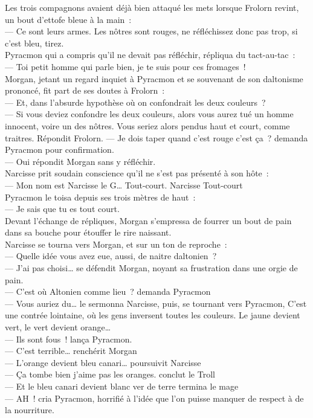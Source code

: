\documentclass[french, a4paper, 12pt]{article}
\begin{document}
Les trois compagnons avaient déjà bien attaqué les mets lorsque Frolorn revint, un bout d'ettofe bleue à la main~:\\
--- Ce sont leurs armes. Les nôtres sont rouges, ne réfléchissez donc pas trop, si c'est bleu, tirez.\\
Pyracmon qui a compris qu'il ne devait pas réfléchir, répliqua du tact-au-tac~:\\
--- Toi petit homme qui parle bien, je te suis pour ces fromages~! \\
Morgan, jetant un regard inquiet à Pyracmon et se souvenant de son daltonisme prononcé, fit part de ses doutes à Frolorn~:\\
--- Et, dans l'absurde hypothèse où on confondrait les deux couleurs~?\\
--- Si vous deviez confondre les deux couleurs, alors vous aurez tué un homme innocent, voire un des nôtres. Vous seriez alors pendus haut et court, comme traitres. Répondit Frolorn.
--- Je dois taper quand c'est rouge c'est ça~? demanda Pyracmon pour confirmation. \\
--- Oui répondit Morgan sans y réfléchir. \\

Narcisse prit soudain conscience qu'il ne s'est pas présenté à son hôte~:\\
--- Mon nom est Narcisse le G… Tout-court. Narcisse Tout-court\\
Pyracmon le toisa depuis ses trois mètres de haut~:\\
--- Je sais que tu es tout court.\\
Devant l'échange de répliques, Morgan s'empressa de fourrer un bout de pain dans sa bouche pour étouffer le rire naissant.\\

Narcisse se tourna vers Morgan, et sur un ton de reproche~:\\
--- Quelle idée vous avez eue, aussi, de naitre daltonien~?\\
--- J'ai pas choisi… se défendit Morgan, noyant sa frustration dans une orgie de pain.\\
--- C'est où Altonien comme lieu~? demanda Pyracmon\\
--- Vous auriez du… le sermonna Narcisse, puis, se tournant vers Pyracmon, C'est une contrée lointaine, où les gens inversent toutes les couleurs. Le jaune devient vert, le vert devient orange…\\
--- Ils sont fous~! lança Pyracmon.\\
--- C'est terrible… renchérit Morgan\\
--- L'orange devient bleu canari… poursuivit Narcisse\\
--- Ça tombe bien j'aime pas les oranges. conclut le Troll\\
--- Et le bleu canari devient blanc ver de terre termina le mage\\
--- AH~! cria Pyracmon, horrifié à l'idée que l'on puisse manquer de respect à de la nourriture.\\
\end{document}
